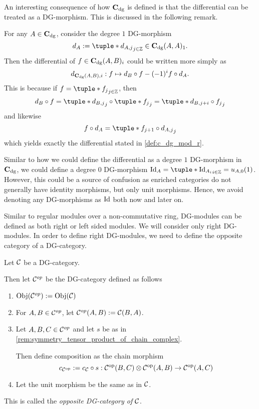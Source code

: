An interesting consequence of how \( \operatorname{\mathbf{C}}_{\operatorname{dg}} \) is defined is that the differential can be treated as a DG-morphism. This is discussed in the following remark.
\begin{remark}
    \label{rem:c_dg_differential}
    For any \( A \in \operatorname{\mathbf{C}}_{\operatorname{dg}} \), consider the degree \( 1 \) DG-morphism
    \[
        d_A := \tuple*{ d_{A, j} }_{j \in \Zb} \in \C_{\dg}(A, A)_1.
    \]
    Then the differential of \( f \in \operatorname{\mathbf{C}}_{\operatorname{dg}}(A, B)_i \) could be written more simply as
    \[
        d_{\operatorname{\mathbf{C}}_{\operatorname{dg}}(A, B), i}: f \mapsto d_B \circ f - (-1)^i f \circ d_A.
    \]
    This is because if \( f = \tuple*{f_j}_{j \in \Zb} \), then
    \[
        d_B \circ f = \tuple*{d_{B, j} }_j \circ \tuple*{ f_j }_j = \tuple*{ d_{B, j + i} \circ f_j }_j
    \]
    and likewise
    \[
        f \circ d_A = \tuple*{f_{j + 1} \circ d_{A, j}}_j
    \]
    which yields exactly the differential stated in \autoref{def:c_dg_mod_r}.
\end{remark}

Similar to how we could define the differential as a degree \( 1 \) DG-morphism in \( \operatorname{\mathbf{C}}_{\operatorname{dg}} \), we could define a degree \( 0 \) DG-morphism \( \Id_A = \tuple*{ \Id_{A_i} }_{i \in \Zb} = u_{A, 0}(1) \). However, this could be a source of confusion as enriched categories do not generally have identity morphisms, but only unit morphisms. Hence, we avoid denoting any DG-morphisms as \( \operatorname{Id} \) both now and later on.

Similar to regular modules over a non-commutative ring, DG-modules can be defined as both right or left sided modules. We will consider only right DG-modules. In order to define right DG-modules, we need to define the opposite category of a DG-category.

\begin{definition}
    \label{def:opposite_dg_category}
    Let \( {\mathcal{C}} \) be a DG-category.

    Then let \( {\mathcal{C}}^{op} \) be the DG-category defined as follows
    \begin{enumerate}
        \item {
            \( \operatorname{Obj}({\mathcal{C}}^{op}) := \operatorname{Obj}({\mathcal{C}}) \)
        }
        \item {
            For \( A, B \in {\mathcal{C}}^{op} \), let \( {\mathcal{C}}^{op}(A, B) := {\mathcal{C}}(B, A) \).
        }
        \item {
            Let \( A, B, C \in {\mathcal{C}}^{op} \) and let \( s \) be as in \autoref{rem:symmetry_tensor_product_of_chain_complex}.
            
            Then define composition as the chain morphism
            \[
                c_{{\mathcal{C}}^{\operatorname{op}}} :=  c_{{\mathcal{C}}} \circ s: {\mathcal{C}}^{\operatorname{op}} (B, C) \otimes {\mathcal{C}}^{\operatorname{op}} (A, B) \to {\mathcal{C}}^{\operatorname{op}} (A, C)
            \]
        }
        \item {
            Let the unit morphism be the same as in \( {\mathcal{C}} \).
        }
    \end{enumerate}
    This is called the \emph{opposite DG-category of \( {\mathcal{C}} \)}.
\end{definition}

